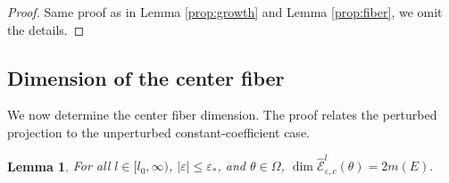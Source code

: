 \documentclass[reqno,11pt]{amsart}
\newtheorem{lemma}{Lemma}[section]
\begin{document}
\begin{proof}
    Same proof as in Lemma \ref{prop:growth} and Lemma \ref{prop:fiber}, we omit the details. 
\end{proof}






\subsection{Dimension of the center fiber}
We now determine the center fiber dimension. The proof relates the perturbed projection to the unperturbed constant-coefficient case.
\begin{lemma}
\label{prop:center-dimension-2m}
For all $l\in[l_0,\infty)$, $|\varepsilon|\le\varepsilon_\ast$, and $\theta\in\Omega$,
$\dim \widehat{\mathcal E}^{l}_{\varepsilon,c}(\theta)=2m(E).$
\end{lemma}
\end{document}
